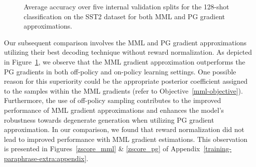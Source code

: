 \documentclass[11pt]{article}
\begin{document}
\begin{figure}[h]
\begin{center}

\end{center}
\caption{Average accuracy over five internal validation splits for the 128-shot classification on the SST2 dataset for both MML and PG gradient approximations.}
\label{mml-vs-pg}
\end{figure}

Our subsequent comparison involves the MML and PG gradient approximations utilizing their best decoding technique without reward normalization. As depicted in Figure~\ref{mml-vs-pg}, we observe that the MML gradient approximation outperforms the PG gradients in both off-policy and on-policy learning settings. One possible reason for this superiority could be the appropriate posterior coefficient assigned to the samples within the MML gradients (refer to Objective~\ref{mml-objective}). Furthermore, the use of off-policy sampling contributes to the improved performance of MML gradient approximations and enhances the model's robustness towards degenerate generation when utilizing PG gradient approximation. In our comparison, we found that reward normalization did not lead to improved performance with MML gradient estimations. This observation is presented in Figures~\ref{zscore_mml} \& \ref{zscore_pg} of Appendix~\ref{training-paraphrase-extra:appendix}.


\begin{comment}
Additionally, Figure~\ref{mml-vs-ppo} compares off-policy sampling with the KL penalty introduced by the PPO regularization. We initially observe that on-policy learning, after a few training steps, tends to generate degenerate paraphrases which lead to random guessing when using the binary classifier. In contrast, the KL penalty incorporated with PPO shows a higher resistance to these degenerate paraphrases. Furthermore, the MML approximation with off-policy sampling outperforms the PPO penalty as well. Off-policy sampling outperforms on-policy sampling when averaged over three decoding techniques used for drawing training samples. This holds true for both MML and PG gradient approximations (See Figure~\ref{off-policy-vs-on-policy} in Appendix~\ref{training-paraphrase-extra:appendix}). We also examined the impact of reward normalization in contrast to using the standard reward, i.e., the log-likelihood of the classifier. The corresponding validation curves for these experiments can be found in Appendix~\ref{training-paraphrase-extra:appendix}.
\end{comment}
\end{document}
